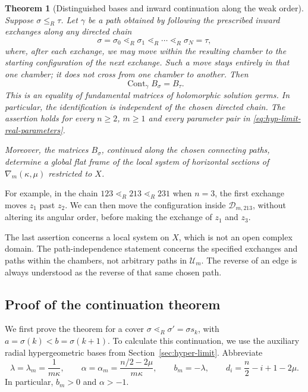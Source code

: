 \documentclass[12pt]{amsart}
\newtheorem{thm}{Theorem}[section]
\theoremstyle{definition}
\numberwithin{equation}{section}
\theoremstyle{definition}
\let\mc\mathcal
\let\al\alpha
\let\gm\gamma
\let\ka\kappa
\let\la\lambda
\let\si\sigma
\let\ge\geqslant
\let\le\leqslant
\def\beq{\begin{equation}}
\def\eeq{\end{equation}}
\begin{document}
\begin{thm}[Distinguished bases and inward continuation along the weak order]
\label{thm:if-main}
\label{prop:if-weak-coherence}
Suppose $\si\le_R\tau$. Let $\gm$ be a path obtained by following
the prescribed inward exchanges along any directed chain
\[
 \si=\si_0\lessdot_R\si_1\lessdot_R\cdots
       \lessdot_R\si_N=\tau,
\]
where, after each exchange, we may move within the resulting
chamber to the starting configuration of the next exchange.
Such a move stays entirely in that one chamber; it does not cross
from one chamber to another. Then
\beq\label{eq:if-main}
 \boxed{\operatorname{Cont}_{\gm}B_\si=B_\tau.}
\eeq
This is an equality of fundamental matrices of holomorphic solution
germs. In particular, the identification
is independent of the chosen directed chain. The assertion holds
for every $n\ge2$, $m\ge1$ and every parameter pair in
\eqref{eq:hyp-limit-real-parameters}.

Moreover, the matrices $B_\si$, continued along the chosen connecting
paths, determine a global flat frame of the local system of horizontal
sections of $\nabla_m(\ka,\mu)$ restricted to $X$.
\end{thm}

For example, in the chain $123\lessdot_R213\lessdot_R231$
when $n=3$, the first exchange moves $z_1$ past $z_2$.
We can then move the configuration inside $\mc D_{m,213}$,
without altering its angular order, before making the exchange
of $z_1$ and $z_3$.

The last assertion concerns a local system on $X$, which is not an
open complex domain. The path-independence statement concerns the
specified exchanges and paths within the chambers, not arbitrary
paths in $\mc U_m$. The reverse of an edge is always understood
as the reverse of that same chosen path.

\subsection{Proof of the continuation theorem}
\label{subsec:if-proof}

We first prove the theorem for a cover
$\si\lessdot_R\si'=\si s_k$, with $a=\si(k)<b=\si(k+1)$.
To calculate this continuation, we use the auxiliary radial
hypergeometric bases from Section~\ref{sec:hyper-limit}. Abbreviate
\beq\label{eq:if-exponents}
 \la=\lambda_m=\frac1{m\ka},\qquad
 \al=\alpha_m=\frac{n/2-2\mu}{m\ka},\qquad
 b_m=-\la,\qquad d_i=\frac n2-i+1-2\mu.
\eeq
In particular, $b_m>0$ and $\al>-1$.
\end{document}
